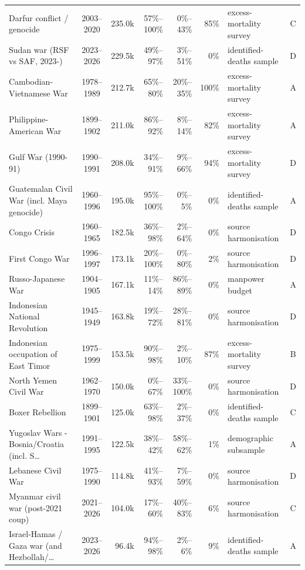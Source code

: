 \documentclass[11pt]{article}
\begin{document}
\begin{scriptsize}
\begin{longtable}{p{4.7cm} c r r r r p{2.8cm} c}
Darfur conflict / genocide & 2003--2020 & 235.0k & 57\%--100\% & 0\%--43\% & 85\% & excess-mortality survey & C \\
Sudan war (RSF vs SAF, 2023-) & 2023--2026 & 229.5k & 49\%--97\% & 3\%--51\% & 0\% & identified-deaths sample & D \\
Cambodian-Vietnamese War & 1978--1989 & 212.7k & 65\%--80\% & 20\%--35\% & 100\% & excess-mortality survey & A \\
Philippine-American War & 1899--1902 & 211.0k & 86\%--92\% & 8\%--14\% & 82\% & excess-mortality survey & A \\
Gulf War (1990-91) & 1990--1991 & 208.0k & 34\%--91\% & 9\%--66\% & 94\% & excess-mortality survey & D \\
Guatemalan Civil War (incl. Maya genocide) & 1960--1996 & 195.0k & 95\%--100\% & 0\%--5\% & 0\% & identified-deaths sample & A \\
Congo Crisis & 1960--1965 & 182.5k & 36\%--98\% & 2\%--64\% & 0\% & source harmonisation & D \\
First Congo War & 1996--1997 & 173.1k & 20\%--100\% & 0\%--80\% & 2\% & source harmonisation & D \\
Russo-Japanese War & 1904--1905 & 167.1k & 11\%--14\% & 86\%--89\% & 0\% & manpower budget & A \\
Indonesian National Revolution & 1945--1949 & 163.8k & 19\%--72\% & 28\%--81\% & 0\% & source harmonisation & D \\
Indonesian occupation of East Timor & 1975--1999 & 153.5k & 90\%--98\% & 2\%--10\% & 87\% & excess-mortality survey & B \\
North Yemen Civil War & 1962--1970 & 150.0k & 0\%--67\% & 33\%--100\% & 0\% & source harmonisation & D \\
Boxer Rebellion & 1899--1901 & 125.0k & 63\%--98\% & 2\%--37\% & 0\% & identified-deaths sample & C \\
Yugoslav Wars - Bosnia/Croatia (incl. S\ldots{} & 1991--1995 & 122.5k & 38\%--42\% & 58\%--62\% & 1\% & demographic subsample & A \\
Lebanese Civil War & 1975--1990 & 114.8k & 41\%--93\% & 7\%--59\% & 0\% & source harmonisation & D \\
Myanmar civil war (post-2021 coup) & 2021--2026 & 104.0k & 17\%--60\% & 40\%--83\% & 6\% & source harmonisation & C \\
Israel-Hamas / Gaza war (and Hezbollah/\ldots{} & 2023--2026 & 96.4k & 94\%--98\% & 2\%--6\% & 9\% & identified-deaths sample & A \\

\end{longtable}
\end{scriptsize}
\end{document}
